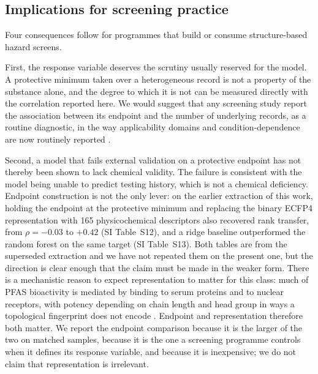 \documentclass[preprint,12pt]{elsarticle}
\begin{document}
\subsection{Implications for screening practice}

Four consequences follow for programmes that build or consume structure-based
hazard screens.

First, the response variable deserves the scrutiny usually reserved for the
model. A protective minimum taken over a heterogeneous record is not a property
of the substance alone, and the degree to which it is not can be measured
directly with the correlation reported here. We would suggest that any
screening study report the association between its endpoint and the number of
underlying records, as a routine diagnostic, in the way applicability domains
and condition-dependence are now routinely reported
\cite{kang2026dbpcarto}.

Second, a model that fails external validation on a protective endpoint has not
thereby been shown to lack chemical validity. The failure is consistent with the
model being unable to predict testing history, which is not a chemical
deficiency. Endpoint construction is not the only lever: on the earlier
extraction of this work, holding the endpoint at the protective minimum and
replacing the binary ECFP4 representation with 165 physicochemical descriptors
also recovered rank transfer, from $\rho=-0.03$ to $+0.42$ (SI Table~S12), and a
ridge baseline outperformed the random forest on the same target (SI
Table~S13). Both tables are from the superseded extraction and we have not
repeated them on the present one, but the direction is clear enough that the
claim must be made in the weaker form. There is a mechanistic reason to expect
representation to matter for this class: much of PFAS bioactivity is mediated
by binding to serum proteins and to nuclear receptors, with potency depending
on chain length and head group in ways a topological fingerprint does not
encode
\cite{cheng2018protein,vandenheuvel2006ppar,wolf2008ppar}. Endpoint and representation therefore both matter.
We report the endpoint comparison because it is the larger of the two on matched
samples, because it is the one a screening programme controls when it defines its
response variable, and because it is inexpensive; we do not claim that
representation is irrelevant.
\end{document}
